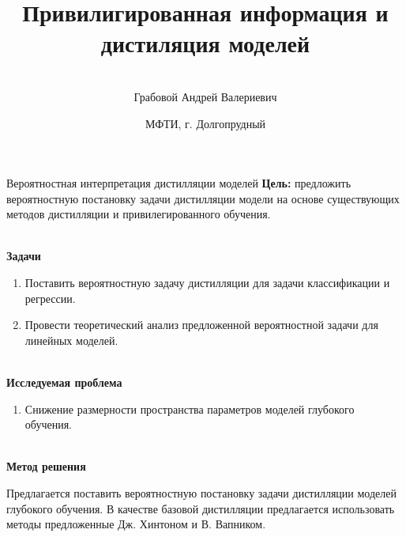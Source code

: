 \documentclass[9pt,pdf,hyperref={unicode}]{beamer}
\title[\hbox to 56mm{истилляция и привилигированная информация \hfill\insertframenumber\,/\,\inserttotalframenumber}]
{Привилигированная информация и дистиляция моделей}
\author[А.\,В.~Грабовой]{\large \\Грабовой Андрей Валериевич}
\institute{\large
Московский физико-технический институт}
\date{\footnotesize{МФТИ, г. Долгопрудный}}
\begin{document}
\begin{frame}
\titlepage
\end{frame}

\begin{frame}{Вероятностная интерпретация дистилляции моделей}
\justifying
\textbf{Цель:} предложить вероятностную постановку задачи дистилляции модели на основе существующих методов дистилляции и привилегированного обучения.



~\\
\textbf{Задачи}

\begin{enumerate}
\justifying
	\item Поставить вероятностную задачу дистилляции для задачи классификации и регрессии.
	\item Провести теоретический анализ предложенной вероятностной задачи для линейных моделей.
\end{enumerate}

~\\
\textbf{Исследуемая проблема}
\begin{enumerate}
\justifying
	\item Снижение размерности пространства параметров моделей глубокого обучения.
\end{enumerate}

~\\
\textbf{Метод решения}

	Предлагается поставить вероятностную постановку задачи дистилляции моделей глубокого обучения. В качестве базовой дистилляции предлагается использовать методы предложенные Дж. Хинтоном и В. Вапником.
	
\end{frame}
\end{document}
